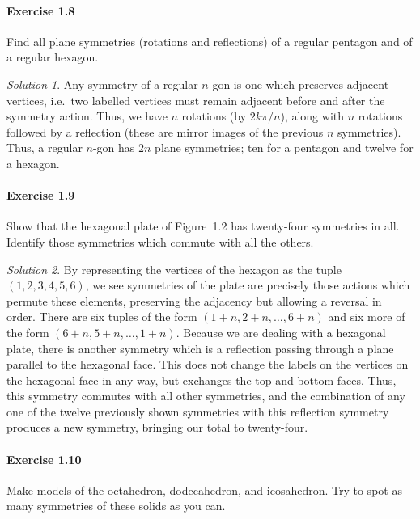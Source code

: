 \documentclass[11pt]{report}
\theoremstyle{remark}
\newtheorem*{solution}{Solution}
\begin{document}
    \paragraph{Exercise 1.8} Find all plane symmetries (rotations and reflections)
    of a regular pentagon and of a regular hexagon.
    \begin{solution}
        Any symmetry of a regular $n$-gon is one which preserves adjacent vertices,
        i.e.\ two labelled vertices must remain adjacent before and after the
        symmetry action. Thus, we have $n$ rotations (by $2k\pi / n$), along with
        $n$ rotations followed by a reflection (these are mirror images of the
        previous $n$ symmetries). Thus, a regular $n$-gon has $2n$ plane symmetries;
        ten for a pentagon and twelve for a hexagon.
    \end{solution}

    \paragraph{Exercise 1.9} Show that the hexagonal plate of Figure~1.2 has
    twenty-four symmetries in all. Identify those symmetries which commute with all
    the others.
    \begin{solution}
        By representing the vertices of the hexagon as the tuple $(1, 2, 3, 4, 5,
        6)$, we see symmetries of the plate are precisely those actions which
        permute these elements, preserving the adjacency but allowing a reversal in
        order. There are six tuples of the form $(1 + n, 2 + n, \dots, 6 + n)$ and
        six more of the form $(6 + n, 5 + n, \dots, 1 + n)$.
        Because we are dealing with a hexagonal plate, there is another symmetry
        which is a reflection passing through a plane parallel to the hexagonal
        face. This does not change the labels on the vertices on the hexagonal face
        in any way, but exchanges the top and bottom faces. Thus, this symmetry
        commutes with all other symmetries, and the combination of any one of the
        twelve previously shown symmetries with this reflection symmetry produces a
        new symmetry, bringing our total to twenty-four.
    \end{solution}

    \paragraph{Exercise 1.10} Make models of the octahedron, dodecahedron, and
    icosahedron. Try to spot as many symmetries of these solids as you can.
    
\end{document}
